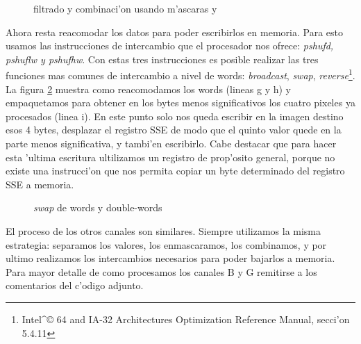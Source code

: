 \begin{figure}[ht]
\caption{filtrado y combinaci'on usando m'ascaras  y }
\label{est:separar-2}
\end{figure}

Ahora resta reacomodar los datos para poder escribirlos en memoria. Para esto usamos las instrucciones de intercambio que el procesador nos ofrece: \textit{pshufd, pshuflw y pshufhw}. Con estas tres instrucciones es posible realizar las tres funciones mas comunes de intercambio a nivel de words: \textit{broadcast}, \textit{swap}, \textit{reverse}\footnote{Intel^{\copyright} 64 and IA-32 Architectures Optimization Reference Manual, secci'on 5.4.11}. La figura \ref{est:separar-3} muestra como reacomodamos los words (lineas g y h) y empaquetamos para obtener en los bytes menos significativos los cuatro pixeles ya procesados (linea i). En este punto solo nos queda escribir en la imagen destino esos 4 bytes, desplazar el registro SSE de modo que el quinto valor quede en la parte menos significativa, y tambi'en escribirlo. Cabe destacar que para hacer esta 'ultima escritura ultilizamos un registro de prop'osito general, porque no existe una instrucci'on que nos permita copiar un byte determinado del registro SSE a memoria.

\begin{figure}[ht]
\caption{\textit{swap} de words y double-words}
\label{est:separar-3}
\end{figure}

El proceso de los otros canales son similares. Siempre utilizamos la misma estrategia: separamos los valores, los enmascaramos, los combinamos, y por ultimo realizamos los intercambios necesarios para poder bajarlos a memoria. Para mayor detalle de como procesamos los canales B y G remitirse a los comentarios del c'odigo adjunto.



